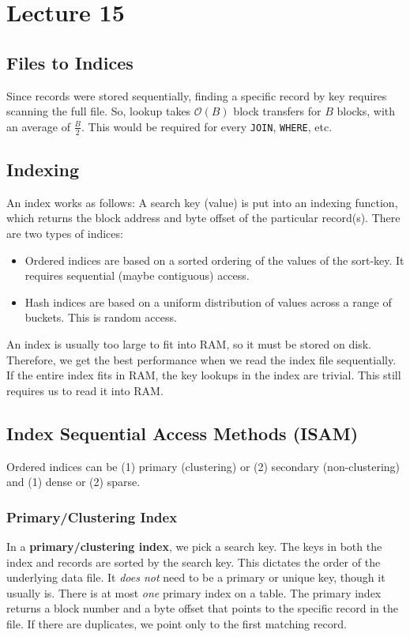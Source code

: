 \documentclass{report}
\renewcommand{\bf}[1]{\textbf{{#1}}}
\renewcommand{\tt}[1]{\texttt{{#1}}}
\renewcommand{\it}[1]{\textit{{#1}}}
\begin{document}
\chapter{Lecture 15}
\section{Files to Indices}
Since records were stored sequentially, finding a specific record by key
requires scanning the full file. So, lookup takes $\mathcal{O}(B)$ block
transfers for $B$ blocks, with an average of $\frac{B}{2}$. This would be
required for every \tt{JOIN}, \tt{WHERE}, etc.

\section{Indexing}
An index works as follows: A search key (value) is put into an indexing
function, which returns the block address and byte offset of the particular
record(s). There are two types of indices:
\begin{itemize}[label=$\to$]
    \item Ordered indices are based on a sorted ordering of the values of the
        sort-key. It requires sequential (maybe contiguous) access.

    \item Hash indices are based on a  uniform distribution of values across a
        range of buckets. This is random access.
\end{itemize}

An index is usually too large to fit into RAM, so it must be stored on disk.
Therefore, we get the best performance when we read the index file sequentially.
If the entire index fits in RAM, the key lookups in the index are trivial. This
still requires us to read it into RAM.

\section{Index Sequential Access Methods (ISAM)}
Ordered indices can be (1) primary (clustering) or (2) secondary
(non-clustering) and (1) dense or (2) sparse.

\subsection{Primary/Clustering Index}
In a \bf{primary/clustering index}, we pick a search key. The keys in both the
index and records are sorted by the search key. This dictates the order of the
underlying data file. It \it{does not} need to be a primary or unique key,
though it usually is. There is at most \it{one} primary index on a table. The
primary index returns a block number and a byte offset that points to the
specific record in the file. If there are duplicates, we point only to the first
matching record.
\end{document}
